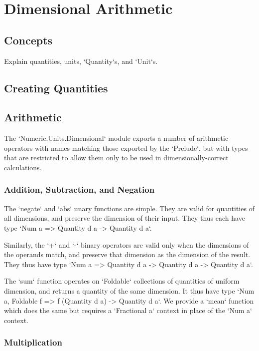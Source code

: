 \documentclass[11pt]{report}
\begin{document}
\chapter{Dimensional Arithmetic}

\section{Concepts}

Explain quantities, units, `Quantity`s, and `Unit`s.

\section{Creating Quantities}


\section{Arithmetic}

The `Numeric.Units.Dimensional` module exports a number of arithmetic operators with names matching those
exported by the `Prelude`, but with types that are restricted to allow them only to be used in dimensionally-correct
calculations.

\subsection{Addition, Subtraction, and Negation}

The `negate` and `abs` unary functions are simple. They are valid for quantities of all dimensions, and preserve the
dimension of their input. They thus each have type `Num a => Quantity d a -> Quantity d a`.

Similarly, the `+` and `-` binary operators are valid only when the dimensions of the operands match, and preserve that
dimension as the dimension of the result. They thus have type `Num a => Quantity d a -> Quantity d a -> Quantity d a`.

The `sum` function operates on `Foldable` collections of quantities of uniform dimension, and returns a quantity of
the same dimension. It thus have type `Num a, Foldable f => f (Quantity d a) -> Quantity d a`. We provide a `mean` function
which does the same but requires a `Fractional a` context in place of the `Num a` context.

\subsection{Multiplication}
\end{document}
